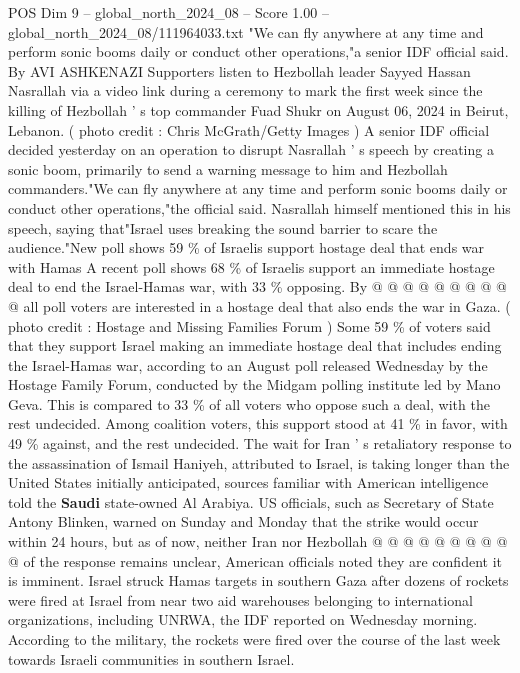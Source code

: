 \begin{textsample}{POS Dim 9 – global\_north\_2024\_08 – Score 1.00 – global\_north\_2024\_08/111964033.txt}  \label{ex:f9_pos_362}
"We can fly anywhere at any time and perform sonic booms daily or conduct other operations,"a senior IDF official said.
By AVI ASHKENAZI Supporters listen to Hezbollah leader Sayyed Hassan Nasrallah via a video link during a ceremony to mark the first week since the killing of Hezbollah ' s top commander Fuad Shukr on August 06, 2024 in Beirut, Lebanon. ( photo credit : Chris McGrath/Getty Images ) A senior IDF official decided yesterday on an operation to disrupt Nasrallah ' s speech by creating a sonic boom, primarily to send a warning message to him and Hezbollah commanders."We can fly anywhere at any time and perform sonic booms daily or conduct other operations,"the official said.
Nasrallah himself mentioned this in his speech, saying that"Israel uses breaking the sound barrier to scare the audience."New poll shows 59 \% of Israelis support hostage deal that ends war with Hamas A recent poll shows 68 \% of Israelis support an immediate hostage deal to end the Israel-Hamas war, with 33 \% opposing.
By @ @ @ @ @ @ @ @ @ @ all poll voters are interested in a hostage deal that also ends the war in Gaza. ( photo credit : Hostage and Missing Families Forum ) Some 59 \% of voters said that they support Israel making an immediate hostage deal that includes ending the Israel-Hamas war, according to an August poll released Wednesday by the Hostage Family Forum, conducted by the Midgam polling institute led by Mano Geva.
This is compared to 33 \% of all voters who oppose such a deal, with the rest undecided.
Among coalition voters, this support stood at 41 \% in favor, with 49 \% against, and the rest undecided.
The wait for Iran ' s retaliatory response to the assassination of Ismail Haniyeh, attributed to Israel, is taking longer than the United States initially anticipated, sources familiar with American intelligence told the \textbf{Saudi} state-owned Al Arabiya.
US officials, such as Secretary of State Antony Blinken, warned on Sunday and Monday that the strike would occur within 24 hours, but as of now, neither Iran nor Hezbollah @ @ @ @ @ @ @ @ @ @ of the response remains unclear, American officials noted they are confident it is imminent.
Israel struck Hamas targets in southern Gaza after dozens of rockets were fired at Israel from near two aid warehouses belonging to international organizations, including UNRWA, the IDF reported on Wednesday morning.
According to the military, the rockets were fired over the course of the last week towards Israeli communities in southern Israel.

\end{textsample}
